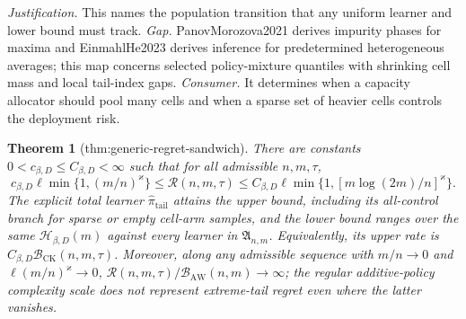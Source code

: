 \documentclass{article}
\newtheorem{theorem}{Theorem}
\begin{document}
\par\smallskip\noindent \textit{Justification.} This names the population transition that any uniform learner and lower bound must track. \textit{Gap.} PanovMorozova2021 derives impurity phases for maxima and EinmahlHe2023 derives inference for predetermined heterogeneous averages; this map concerns selected policy-mixture quantiles with shrinking cell mass and local tail-index gaps. \textit{Consumer.} It determines when a capacity allocator should pool many cells and when a sparse set of heavier cells controls the deployment risk.

\begin{theorem}[thm:generic-regret-sandwich]\label{thm:generic-regret-sandwich}
There are constants \(0<c_{\beta,D}\le C_{\beta,D}<\infty\) such that for all admissible \(n,m,\tau\), \[c_{\beta,D}\ell\min\{1,(m/n)^{\varkappa}\}\le\mathcal R(n,m,\tau)\le C_{\beta,D}\ell\min\{1,[m\log(2m)/n]^{\varkappa}\}.\] The explicit total learner \(\widehat\pi_{\mathrm{tail}}\) attains the upper bound, including its all-control branch for sparse or empty cell-arm samples, and the lower bound ranges over the same \(\mathcal H_{\beta,D}(m)\) against every learner in \(\mathfrak A_{n,m}\). Equivalently, its upper rate is \(C_{\beta,D}\mathcal B_{\mathrm{CK}}(n,m,\tau)\). Moreover, along any admissible sequence with \(m/n\to0\) and \(\ell(m/n)^{\varkappa}\to0\), \(\mathcal R(n,m,\tau)/\mathcal B_{\mathrm{AW}}(n,m)\to\infty\); the regular additive-policy complexity scale does not represent extreme-tail regret even where the latter vanishes.
\end{theorem}
\end{document}
